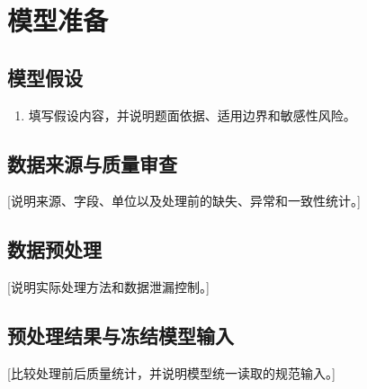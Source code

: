 \section{模型准备}
\subsection{模型假设}
\begin{enumerate}
  \item 填写假设内容，并说明题面依据、适用边界和敏感性风险。
\end{enumerate}
\subsection{数据来源与质量审查}
[说明来源、字段、单位以及处理前的缺失、异常和一致性统计。]
\subsection{数据预处理}
[说明实际处理方法和数据泄漏控制。]
\subsection{预处理结果与冻结模型输入}
[比较处理前后质量统计，并说明模型统一读取的规范输入。]
